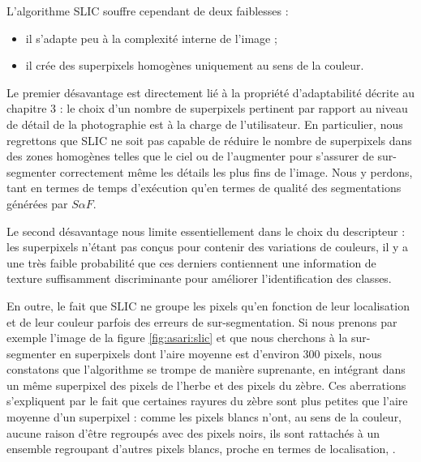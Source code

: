 L'algorithme SLIC souffre cependant de deux faiblesses :
\begin{itemize}
\item il s'adapte peu à la complexité interne de l'image ;
\item il crée des superpixels homogènes uniquement au sens de la couleur. 
\end{itemize}

Le premier désavantage est directement lié à la propriété d'adaptabilité décrite au chapitre 3 : le choix d'un nombre de superpixels pertinent par rapport au niveau de détail de la photographie est à la charge de l'utilisateur. En particulier, nous regrettons que SLIC ne soit pas capable de réduire le nombre de superpixels dans des zones homogènes telles que le ciel ou de l'augmenter pour s'assurer de sur-segmenter correctement même les détails les plus fins de l'image. Nous y perdons, tant en termes de temps d'exécution qu'en termes de qualité des segmentations générées par $S \alpha F$.

Le second désavantage nous limite essentiellement dans le choix du descripteur : les superpixels n'étant pas conçus pour contenir des variations de couleurs, il y a une très faible probabilité que ces derniers contiennent une information de texture suffisamment discriminante pour améliorer l'identification des classes.

En outre, le fait que SLIC ne groupe les pixels qu'en fonction de leur localisation et de leur couleur  parfois des erreurs de sur-segmentation. Si nous prenons par exemple l'image de la figure \ref{fig:asari:slic} et que nous cherchons à la sur-segmenter en superpixels dont l'aire moyenne est d'environ $300$ pixels, nous constatons que l'algorithme se trompe de manière suprenante, en intégrant dans un même superpixel des pixels de l'herbe et des pixels du zèbre. Ces aberrations s'expliquent par le fait que certaines rayures du zèbre sont plus petites que l'aire moyenne d'un superpixel : comme les pixels blancs n'ont, au sens de la couleur, aucune raison d'être regroupés avec des pixels noirs, ils sont rattachés à un ensemble regroupant d'autres pixels blancs, proche en termes de localisation, .

